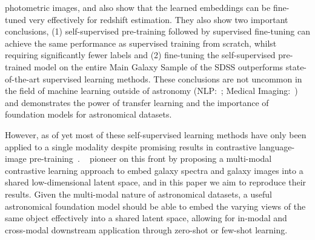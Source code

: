 photometric images, and also show that the learned embeddings can be fine-tuned very effectively for redshift estimation.
They also show two important conclusions, (1) self-supervised pre-training followed by supervised fine-tuning can achieve
the same performance as supervised training from scratch, whilst requiring significantly fewer labels and (2) fine-tuning
the self-supervised pre-trained model on the entire Main Galaxy Sample of the SDSS outperforms state-of-the-art supervised
learning methods.
These conclusions are not uncommon in the field of machine learning outside of astronomy
(NLP:~\cite{devlin2019, radford2018}; Medical Imaging:~\cite{shin2016}) and demonstrates the power of transfer learning
and the importance of foundation models for astronomical datasets.

However, as of yet most of these self-supervised learning methods have only been applied to a single modality despite
promising results in contrastive language-image pre-training~\citep{radford2021}.
~\cite{astroclip} pioneer on this front by proposing a multi-modal contrastive learning approach to embed galaxy spectra
and galaxy images into a shared low-dimensional latent space, and in this paper we aim to reproduce their results.
Given the multi-modal nature of astronomical datasets, a useful astronomical foundation model should be able to embed
the varying views of the same object effectively into a shared latent space, allowing for in-modal and cross-modal downstream
application through zero-shot or few-shot learning.
